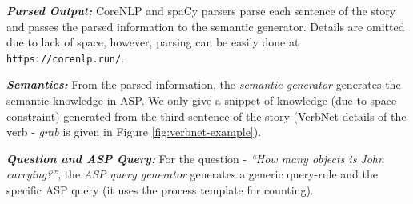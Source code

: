 \documentclass[letterpaper]{article}
\begin{document}
\smallskip
\noindent \textit{\textbf{Parsed Output: }} CoreNLP and spaCy parsers parse each sentence of the story and passes the parsed information to the semantic generator. Details are omitted due to lack of space, however, parsing can be easily done at \texttt{https://corenlp.run/}.

\noindent \textit{\textbf{Semantics: }}
From the parsed information, the \textit{semantic generator} generates the semantic knowledge in ASP. We only give a snippet of knowledge (due to space constraint) generated from the third sentence of the story (VerbNet details of the verb - \textit{grab} is given in Figure \ref{fig:verbnet-example}).

\smallskip
\noindent
\cprotect {}

\smallskip

\noindent \textit{\textbf{Question and ASP Query: } }
For the question - \textit{``How many objects is John carrying?''}, the\textit{ ASP query generator} generates a generic query-rule and the specific ASP query (it uses the process template for counting).


\smallskip
\noindent
\cprotect {}
\end{document}
